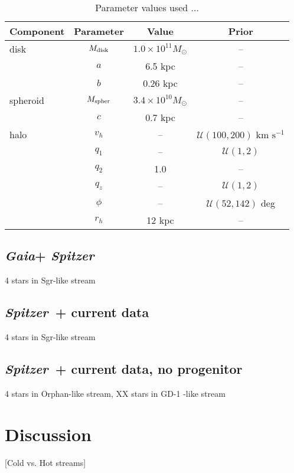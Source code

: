 \documentclass[letterpaper,12pt,preprint]{aastex}
\newcommand{\project}[1]{\textsl{#1}}
\newcommand{\gaia}{\project{Gaia}}
\newcommand{\spitzer}{\project{Spitzer}~}
\begin{document}
\begin{table}[h]
\begin{center}
	\begin{tabular}{l c c c} \toprule
		{\bf Component} & {\bf Parameter} & {\bf Value} & {\bf Prior} \\\toprule
		disk & $M_{\rm disk}$ & $1.0\times10^{11}M_\odot$ & -- \\ 
		& $a$ & 6.5 kpc & --\\
		& $b$ & 0.26 kpc & --\\
		\midrule
		spheroid & $M_{\rm spher}$ & $3.4\times10^{10}M_\odot$ & --\\ 
		& $c$ & 0.7 kpc & --\\
		\midrule
		halo & $v_h$ & -- & $\mathcal{U}(100,200)$ km $\mathrm{s}^{-1}$ \\
		& $q_1$ & -- & $\mathcal{U}(1,2)$\\
		& $q_2$ & 1.0 & --\\
		& $q_z$ & -- & $\mathcal{U}(1,2)$\\
		& $\phi$ & -- & $\mathcal{U}(52,142)$ deg\\
		& $r_h$ & 12 kpc & --\\
		\bottomrule
		\hline
	\end{tabular}
	\caption{Parameter values used ...\label{tbl:potential}}
\end{center}
\end{table}

\subsection{\gaia + \spitzer}
4 stars in Sgr-like stream

\subsection{\spitzer + current data}
4 stars in Sgr-like stream

\subsection{\spitzer + current data, no progenitor}
4 stars in Orphan-like stream, XX stars in GD-1 -like stream

\section{Discussion}

[Cold vs. Hot streams]
\end{document}
